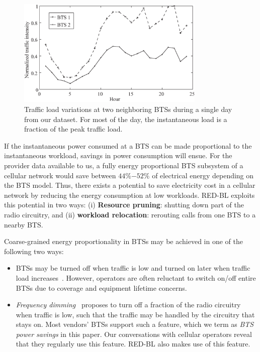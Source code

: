 \begin{figure}[t]
\centering
\includegraphics[width=0.8\textwidth]{pics/ilyas1.eps}
\caption{Traffic load variations at two neighboring BTSs during a single day from our dataset. For most of the day, the instantaneous load is a fraction of the peak traffic load.}
\label{fig:workload-variation}
\end{figure}


If the instantaneous power consumed at a BTS can be made proportional to the instantaneous
workload, savings in power consumption will ensue.
For the provider data available to us, a fully energy proportional BTS subsystem of a cellular network would save between $44\%$$-$$52\%$ of electrical energy depending on the BTS model.
Thus, there exists a potential to save electricity cost in a cellular network by reducing the energy consumption at low workloads.
RED-BL exploits this potential in two ways: (i) \textbf{Resource pruning}: shutting down part of the radio circuitry, and (ii) \textbf{workload relocation}: rerouting calls from one BTS to a nearby BTS.

 
Coarse-grained energy proportionality in BTSs may be achieved in one of the following two ways:
\begin{itemize}
\item BTSs may be turned off when traffic is low and turned on later when traffic load
increases~\cite{Oh:TWC:2013,6503647,Oh:Globecom:2010,5208045,Oh:Comm:2011,marsan:wgreen:2008}.
However, operators are often reluctant to switch on/off entire BTSs due to coverage and equipment lifetime concerns.
\item \textit{Frequency dimming}~\cite{Tipper:Dimming:Globecom:2010} proposes to turn off a fraction of
the radio circuitry when traffic is low, such that the traffic may be handled by the circuitry that stays on.
Most vendors' BTSs support such a feature, which we term as \textit{BTS power savings} in this paper.
Our conversations with cellular operators reveal that they regularly use this feature. RED-BL also makes use
of this feature.
\end{itemize}

